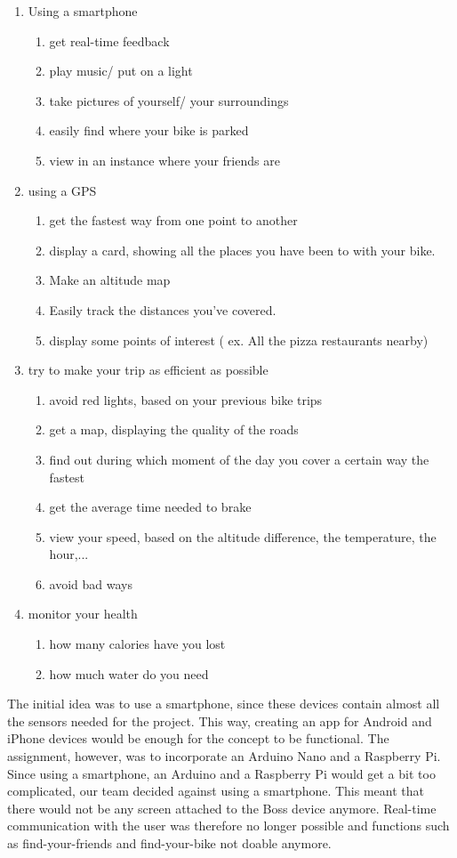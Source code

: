 \begin{enumerate}
 \item Using a smartphone
 \begin{enumerate}
 \item get real-time feedback
 \item play music/ put on a light
 \item take pictures of yourself/ your surroundings 
 \item easily find where your bike is parked
 \item view in an instance where your friends are
 \end{enumerate}
 \item using a GPS
  \begin{enumerate}
  \item get the fastest way from one point to another
  \item display a card, showing all the places you have been to with your bike. 
  \item Make an altitude map
  \item Easily track the distances you've covered.
  \item display some points of interest ( ex. All the pizza restaurants nearby)
  \end{enumerate}
  \item try to make your trip as efficient as possible
  \begin{enumerate}
  \item avoid red lights, based on your previous bike trips
  \item get a map, displaying the quality of the roads 
  \item find out during which moment of the day you cover a certain way the fastest
  \item get the average time needed to brake
  \item view your speed, based on the altitude difference, the temperature, the hour,...
  \item avoid bad ways 
  \end{enumerate}
  \item monitor your health
  \begin{enumerate}
   \item how many calories have you lost
    \item how much water do you need 
  \end{enumerate}
\end{enumerate}


The initial idea was to use a smartphone, since these devices contain almost all the sensors needed for the project. 
This way, creating an app for Android and iPhone devices would be enough for the concept to be functional. 
The assignment, however, was to incorporate an Arduino Nano and a Raspberry Pi. 
Since using a smartphone, an Arduino and a Raspberry Pi would get a bit too complicated, our team decided against using a smartphone. 
This meant that there would not be any screen attached to the Boss device anymore. 
Real-time communication with the user was therefore no longer possible and functions such as find-your-friends and find-your-bike not doable anymore. 

